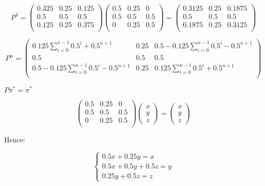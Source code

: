\documentclass[12pt]{article}
\begin{document}
	$$ 
	P^3 = 
	\left(
	\begin{matrix}
	0.325 & 0.25 & 0.125 \\
	0.5 & 0.5 & 0.5 \\
	0.125  & 0.25 & 0.375 \\
	\end{matrix}
	\right)
	\left(
	\begin{matrix}
	0.5 & 0.25 & 0 \\
	0.5 & 0.5 & 0.5 \\
	0  & 0.25 & 0.5 \\
	\end{matrix}
	\right)= \left(
	\begin{matrix}
	0.3125 & 0.25 & 0.1875 \\
	0.5 & 0.5 & 0.5 \\
	0.1875  & 0.25 & 0.3125\\
	\end{matrix}
	\right)
	$$
	
	$$ 
		P^n = 
		\left(
		\begin{matrix}
		0.125\sum_{i = 0}^{n - 1}0.5^i + 0.5^{n + 1} & 0.25 & 0.5 - 0.125\sum_{i = 0}^{n - 1}0.5^i - 0.5^{n + 1}  \\
		0.5 & 0.5 & 0.5 \\
		0.5 - 0.125\sum_{i = 0}^{n - 1}0.5^i - 0.5^{n + 1}  & 0.25 & 0.125\sum_{i = 0}^{n - 1}0.5^i + 0.5^{n + 1} \\
		\end{matrix}
		\right)
	$$
	
	$P\pi^* = \pi^*$
	
	$$
	\left(
	\begin{matrix}
	0.5 & 0.25 & 0 \\
	0.5 & 0.5 & 0.5 \\
	0  & 0.25 & 0.5  \\
	\end{matrix}
	\right)
	\left(
	\begin{matrix}
	x \\
	y \\
	z
	\end{matrix}
	\right) = \left(
	\begin{matrix}
	x \\
	y \\
	z
	\end{matrix}
	\right)
	$$
	
	Hence:
	
	$$
	\begin{cases}
		0.5x + 0.25 y = x\\
		0.5 x + 0.5 y + 0.5 z = y\\
		0.25 y + 0.5z  = z
	\end{cases}
	$$
	
\end{document}
